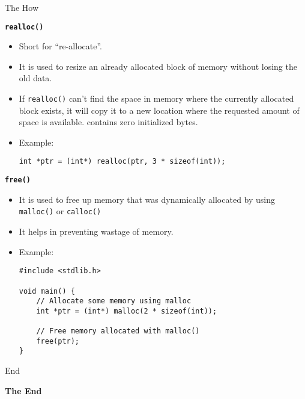 \documentclass[11pt]{beamer}
\begin{document}
\begin{frame}{The How}
        \framebreak

        \textbf{\texttt{\large realloc()}}\\[10pt]

        \begin{itemize}
            \item Short for ``re-allocate''.
            \item It is used to resize an already allocated block of memory without losing the old data.
            \item If \texttt{realloc()} can't find the space in memory where the currently allocated block exists, it
            will copy it to a new location where the requested amount of space is available.
            contains zero initialized bytes.
            \item Example:
            \begin{tcolorbox}
                \begin{verbatim}
int *ptr = (int*) realloc(ptr, 3 * sizeof(int));
                \end{verbatim}
            \end{tcolorbox}
        \end{itemize}

        \framebreak
        \textbf{\texttt{\large free()}}
        \begin{itemize}
            \item It is used to free up memory that was dynamically allocated by using \texttt{malloc()} or
            \texttt{calloc()}
            \item It helps in preventing wastage of memory.
            \item Example:
            \begin{tcolorbox}
                \begin{verbatim}
#include <stdlib.h>

void main() {
    // Allocate some memory using malloc
    int *ptr = (int*) malloc(2 * sizeof(int));

    // Free memory allocated with malloc()
    free(ptr);
}
                \end{verbatim}
            \end{tcolorbox}
        \end{itemize}

    \end{frame}

    \begin{frame}{End}
        \begin{center}
            \textbf{\Huge The End}
        \end{center}
    \end{frame}
\end{document}
